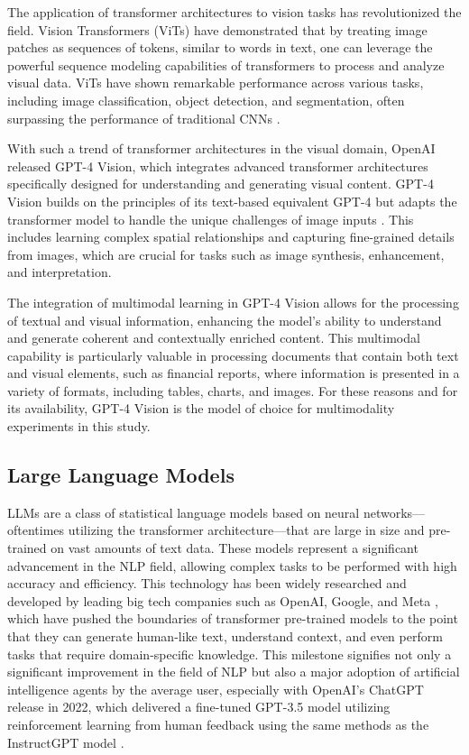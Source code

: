 \documentclass[english, 12pt, a4paper, elec, utf8, a-2b, online]{aaltothesis}
\begin{document}
The application of transformer architectures to vision tasks has revolutionized the field.
Vision Transformers (ViTs) have demonstrated that by treating image patches as sequences of tokens, similar to words in text, one can leverage the powerful sequence modeling capabilities of transformers to process and analyze visual data.
ViTs have shown remarkable performance across various tasks, including image classification, object detection, and segmentation, often surpassing the performance of traditional \ac{CNN}s \cite{Dosovitskiy2021}.

With such a trend of transformer architectures in the visual domain, OpenAI released GPT-4 Vision, which integrates advanced transformer architectures specifically designed for understanding and generating visual content.
GPT-4 Vision builds on the principles of its text-based equivalent GPT-4 but adapts the transformer model to handle the unique challenges of image inputs \cite{2023GPT4VisionSC}.
This includes learning complex spatial relationships and capturing fine-grained details from images, which are crucial for tasks such as image synthesis, enhancement, and interpretation.

The integration of multimodal learning in GPT-4 Vision allows for the processing of textual and visual information, enhancing the model's ability to understand and generate coherent and contextually enriched content.
This multimodal capability is particularly valuable in processing documents that contain both text and visual elements, such as financial reports, where information is presented in a variety of formats, including tables, charts, and images.
For these reasons and for its availability, GPT-4 Vision is the model of choice for multimodality experiments in this study.

\subsection{Large Language Models}

\ac{LLM}s are a class of statistical language models based on neural networks—oftentimes utilizing the transformer architecture—that are large in size and pre-trained on vast amounts of text data.
These models represent a significant advancement in the \ac{NLP} field, allowing complex tasks to be performed with high accuracy and efficiency.
This technology has been widely researched and developed by leading big tech companies such as OpenAI, Google, and Meta \cite{Brown2020, Devlin2019, Radford2021, OpenAI2023GPT4, Gemini2022, Gemini2024}, which have pushed the boundaries of transformer pre-trained models to the point that they can generate human-like text, understand context, and even perform tasks that require domain-specific knowledge.
This milestone signifies not only a significant improvement in the field of \ac{NLP} but also a major adoption of artificial intelligence agents by the average user, especially with OpenAI's ChatGPT release in 2022, which delivered a fine-tuned GPT-3.5 model utilizing reinforcement learning from human feedback using the same methods as the InstructGPT model \cite{Ouyang2022}.
\end{document}
